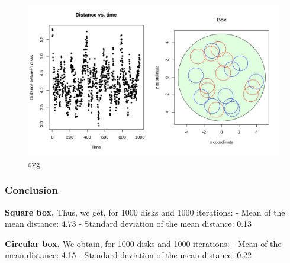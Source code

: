 \documentclass[11pt]{article}
\makeatletter
\newenvironment{Shaded}{}{}
\newcommand{\boxspacing}{\kern\kvtcb@left@rule\kern\kvtcb@boxsep}
\newcommand{\prompt}[4]{
        {\ttfamily\llap{{\color{#2}[#3]:\hspace{3pt}#4}}\vspace{-\baselineskip}}
    }
\makeatother
\begin{document}
\begin{figure}
\centering
\includegraphics{output_20_1.svg}
\caption{svg}
\end{figure}

\hypertarget{conclusion-1}{%
\subsubsection{\texorpdfstring{\textbf{Conclusion}}{Conclusion}}\label{conclusion-1}}

\textbf{Square box.} Thus, we get, for 1000 disks and 1000 iterations: -
Mean of the mean distance: 4.73 - Standard deviation of the mean
distance: 0.13

\textbf{Circular box.} We obtain, for 1000 disks and 1000 iterations: -
Mean of the mean distance: 4.15 - Standard deviation of the mean
distance: 0.22

\begin{Shaded}
\begin{Highlighting}[]

\end{Highlighting}
\end{Shaded}

    \begin{tcolorbox}[breakable, size=fbox, boxrule=1pt, pad at break*=1mm,colback=cellbackground, colframe=cellborder]
\prompt{In}{incolor}{ }{\boxspacing}
\begin{Verbatim}[commandchars=\\\{\}]

\end{Verbatim}
\end{tcolorbox}


    
    
    
\end{document}
